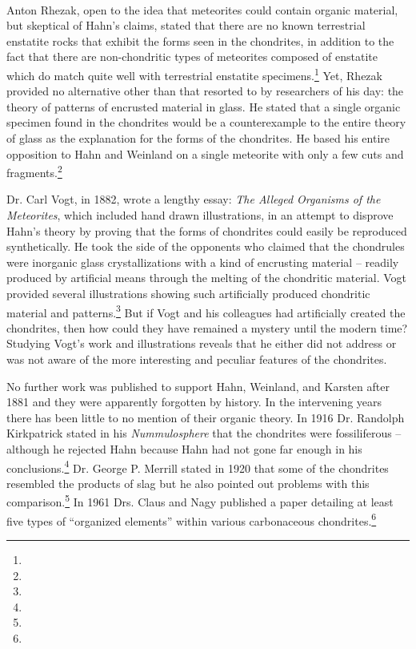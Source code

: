 \documentclass[a4paper, 12pt, oneside]{article}
\begin{document}
\paragraph*{}
Anton Rhezak, open to the idea that meteorites could contain organic material, but skeptical of Hahn's claims, stated that there are no known terrestrial enstatite rocks that exhibit the forms seen in the chondrites, in addition to the fact that there are non-chondritic types of meteorites composed of enstatite which do match quite well with terrestrial enstatite specimens.\footnote{} Yet, Rhezak provided no alternative other than that resorted to by researchers of his day: the theory of patterns of encrusted material in glass. He stated that a single organic specimen found in the chondrites would be a counterexample to the entire theory of glass as the explanation for the forms of the chondrites. He based his entire opposition to Hahn and Weinland on a single meteorite with only a few cuts and fragments.\footnote{}

Dr. Carl Vogt, in 1882, wrote a lengthy essay: \emph{The Alleged Organisms of the Meteorites}, which included hand drawn illustrations, in an attempt to disprove Hahn's theory by proving that the forms of chondrites could easily be reproduced synthetically. He took the side of the opponents who claimed that the chondrules were inorganic glass crystallizations with a kind of encrusting material -- readily produced by artificial means through the melting of the chondritic material. Vogt provided several illustrations showing such artificially produced chondritic material and patterns.\footnote{} But if Vogt and his colleagues had artificially created the chondrites, then how could they have remained a mystery until the modern time? Studying Vogt's work and illustrations reveals that he either did not address or was not aware of the more interesting and peculiar features of the chondrites.

No further work was published to support Hahn, Weinland, and Karsten after 1881 and they were apparently forgotten by history. In the intervening years there has been little to no mention of their organic theory. In 1916 Dr. Randolph Kirkpatrick stated in his \emph{Nummulosphere} that the chondrites were fossiliferous -- although he rejected Hahn because Hahn had not gone far enough in his conclusions.\footnote{} Dr. George P. Merrill stated in 1920 that some of the chondrites resembled the products of slag but he also pointed out problems with this comparison.\footnote{} In 1961 Drs. Claus and Nagy published a paper detailing at least five types of ``organized elements'' within various carbonaceous chondrites.\footnote{}
\end{document}
